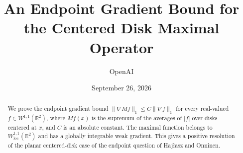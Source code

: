 \documentclass[11pt]{article}
\title{An Endpoint Gradient Bound for the Centered Disk Maximal Operator}
\author{OpenAI}
\date{September 26, 2026}
\newcommand{\R}{\mathbb R}
\newcommand{\1}{\mathbf 1}
\theoremstyle{definition}
\theoremstyle{remark}
\numberwithin{equation}{section}
\begin{document}
\maketitle
\begin{abstract}
We prove the endpoint gradient bound $\|\nabla Mf\|_1\le C\|\nabla f\|_1$
for every real-valued $f\in W^{1,1}(\R^2)$, where $Mf(x)$ is the supremum
of the averages of $|f|$ over disks centered at $x$, and $C$ is an absolute
constant. The maximal function belongs to $W^{1,1}_{\mathrm{loc}}(\R^2)$
and has a globally integrable weak gradient. This gives a positive resolution
of the planar centered-disk case of the endpoint question of Haj{\l}asz and
Onninen.
\end{abstract}






\appendix

\setlength{\bibsep}{4pt}


\end{document}
